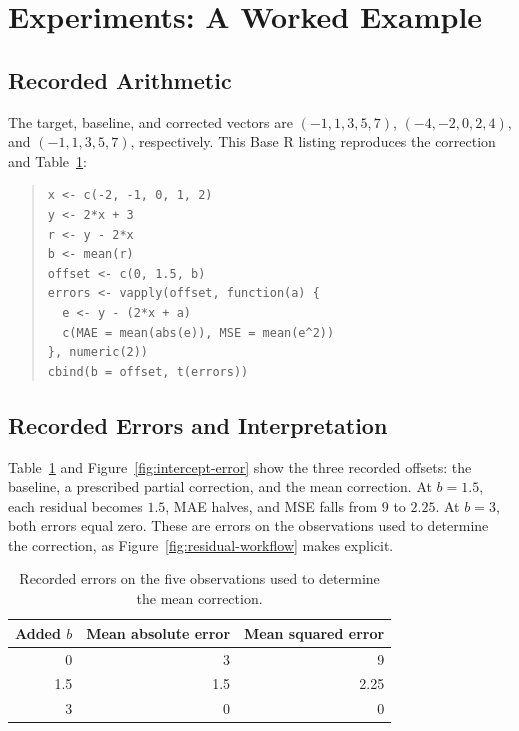 \documentclass[11pt]{article}
\begin{document}
\section{Experiments: A Worked Example}

\subsection{Recorded Arithmetic}

The target, baseline, and corrected vectors are
$(-1,1,3,5,7)$, $(-4,-2,0,2,4)$, and $(-1,1,3,5,7)$, respectively. This Base R listing reproduces the correction and Table~\ref{tab:recorded-errors}:
\begin{quote}
\begin{minipage}{\linewidth}
\small
\begin{verbatim}
x <- c(-2, -1, 0, 1, 2)
y <- 2*x + 3
r <- y - 2*x
b <- mean(r)
offset <- c(0, 1.5, b)
errors <- vapply(offset, function(a) {
  e <- y - (2*x + a)
  c(MAE = mean(abs(e)), MSE = mean(e^2))
}, numeric(2))
cbind(b = offset, t(errors))
\end{verbatim}
\end{minipage}
\end{quote}

\subsection{Recorded Errors and Interpretation}

Table~\ref{tab:recorded-errors} and Figure~\ref{fig:intercept-error} show the three recorded offsets: the baseline, a prescribed partial correction, and the mean correction. At $b=1.5$, each residual becomes $1.5$, MAE halves, and MSE falls from $9$ to $2.25$. At $b=3$, both errors equal zero. These are errors on the observations used to determine the correction, as Figure~\ref{fig:residual-workflow} makes explicit.

\begin{table}[!htbp]
\centering
\caption{Recorded errors on the five observations used to determine the mean correction.}
\label{tab:recorded-errors}
\begin{tabular}{rrr}
\toprule
Added $b$ & Mean absolute error & Mean squared error \\
\midrule
0   & 3   & 9    \\
1.5 & 1.5 & 2.25 \\
3   & 0   & 0    \\
\bottomrule
\end{tabular}
\end{table}
\end{document}
